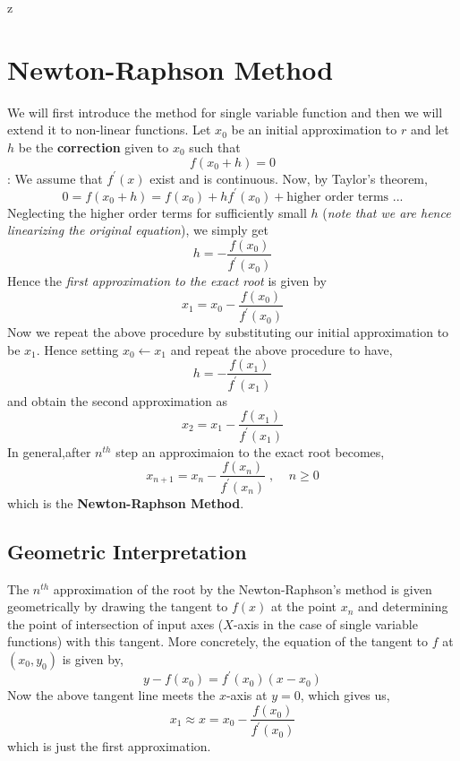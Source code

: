z\documentclass[a4paper,12pt,twoside]{book}
\newcommand{\nll}[0]{\newline\newline}
\newcommand{\tit}[1]{\textit{#1}}
\newcommand{\assum}[0]{\boxed{\textbf{\textit{Assumption}}}}
\begin{document}
\chapter{Newton-Raphson Method}
We will first introduce the method for single variable function and then we will extend it to non-linear functions.
\nll
Let $x_0$ be an initial approximation to $r$ and let $h$ be the \textbf{correction} given to $x_0$ such that 
\[f(x_0 + h) = 0\]
\assum  : We assume that $f^{\prime}(x)$ exist and is continuous.
\nll
Now, by Taylor's theorem,
\[0 = f(x_0 + h) = f(x_0) + hf^\prime (x_0) + \text{higher order terms ...}\]
Neglecting the higher order terms for sufficiently small $h$ (\textit{note that we are hence linearizing the original equation}), we simply get 
\[h = -\frac{f(x_0)}{f^\prime(x_0)}\]
Hence the \tit{first approximation to the exact root} is given by
\[x_1 = x_0 - \frac{f(x_0)}{f^\prime(x_0)} \]
Now we repeat the above procedure by substituting our initial approximation to be $x_1$. Hence setting $x_0 \leftarrow x_1$ and repeat the above procedure to have,
\[h = - \frac{f(x_1)}{f^\prime(x_1)}\]
and obtain the second approximation as 
\[x_2 = x_1 - \frac{f(x_1)}{f^\prime(x_1)}\]
In general,after $n^{th}$ step an approximaion to the exact root becomes,
\[\boxed{x_{n+1} = x_n - \frac{f(x_n)}{f^\prime(x_n)}\;,\;\;\;\;n\ge 0}\]
which is the \textbf{Newton-Raphson Method}.
\section{Geometric Interpretation}
The $n^{th}$ approximation of the root by the Newton-Raphson's method is given geometrically by drawing the tangent to $f(x)$ at the point $x_{n}$ and determining the point of intersection of input axes ($X$-axis in the case of single variable functions) with this tangent.
\nll
More concretely, the equation of the tangent to $f$ at $(x_0, y_0)$ is given by,
\[y - f(x_0) = f^\prime (x_0) ( x-x_0)\]
Now the above tangent line meets the $x$-axis at $y=0$, which gives us,
\[x_1 \approx x = x_0 - \frac{f(x_0)}{f^\prime(x_0)}\]
which is just the first approximation.
\end{document}
